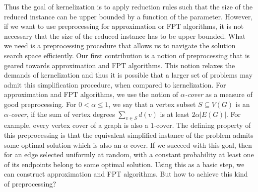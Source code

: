   
 Thus the goal of kernelization is to apply reduction rules such that  the size of the reduced instance can be upper bounded by a function of the parameter. However, if we want to use preprocessing for approximation or  FPT algorithms, it is not necessary 
 that  the size of the reduced instance has to be upper bounded. What we need is a preprocessing procedure that allows us  to 
 navigate the solution search space efficiently.  Our first contribution is a notion of preprocessing  that is 
  geared towards  approximation and FPT algorithms. This notion relaxes the demands of kernelization and thus it is possible 
  that a larger set of problems may admit this simplification procedure, when compared to kernelization. 
For approximation and FPT algorithms, we use the notion of {\em $\alpha$-cover} as a measure of good preprocessing. 
For  $0<\alpha\leq 1$, we say that a vertex subset $S\subseteq V(G)$ is an \emph{$\alpha$-cover}, if 
the sum of vertex degrees     $\sum_{v \in S} d(v) $ is at least  $2 \alpha |E(G)|$.
  For example, every vertex cover of a graph is also a $1$-cover. 
  The  defining property of this preprocessing is that the equivalent simplified instance of the problem
 admits some optimal solution which is also  an $\alpha$-cover.  If we succeed with this goal, then for  an edge  selected 
 uniformly at random,   with a constant probability   at least  one of its endpoints belong to some optimal solution. Using this as a basic step, we 
can construct approximation and FPT algorithms. 
 But how to  achieve this kind of preprocessing?
 


